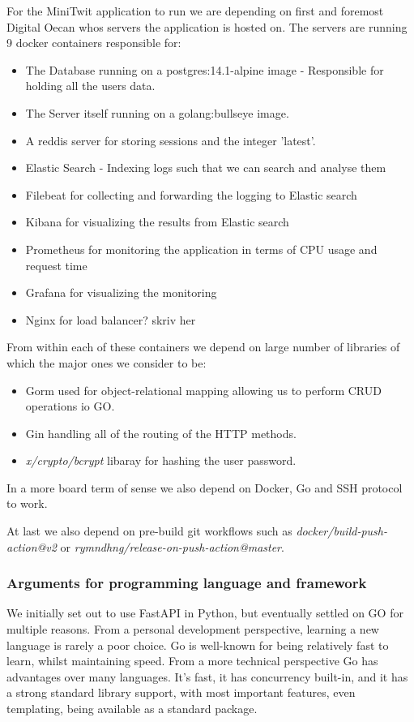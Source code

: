 For the MiniTwit application to run we are depending on first and foremost Digital Oecan whos servers the application is 
hosted on. The servers are running 9 docker containers responsible for: 
\begin{itemize}
    \item The Database running on a postgres:14.1-alpine image - Responsible for holding all the users data.
    \item The Server itself running on a golang:bullseye image.
    \item A reddis server for storing sessions and the integer 'latest'.
    \item Elastic Search - Indexing logs such that we can search and analyse them
    \item Filebeat for collecting and forwarding the logging to Elastic search
    \item Kibana for visualizing the results from Elastic search
    \item Prometheus for monitoring the application in terms of CPU usage and request time
    \item Grafana for visualizing the monitoring
    \item Nginx for load balancer? skriv her
\end{itemize}

From within each of these containers we depend on large number of libraries of which the major ones we consider to be:
\begin{itemize}
    \item Gorm used for object-relational mapping allowing us to perform CRUD operations io GO.
    \item Gin handling all of the routing of the HTTP methods.
    \item \textit{x/crypto/bcrypt} libaray for hashing the user password.
\end{itemize}

In a more board term of sense we also depend on Docker, Go and SSH protocol to work.

At last we also depend on pre-build git workflows such as \textit{docker/build-push-action@v2} or \textit{rymndhng/release-on-push-action@master}.

\subsubsection{Arguments for programming language and framework}
We initially set out to use FastAPI in Python, but eventually settled on GO for multiple reasons. From a personal 
development perspective, learning a new language is rarely a poor choice. Go is well-known for being relatively 
fast to learn, whilst maintaining speed. From a more technical perspective Go has advantages over many languages. 
It's fast, it has concurrency built-in, and it has a strong standard library support, with most important features, 
even templating, being available as a standard package.

